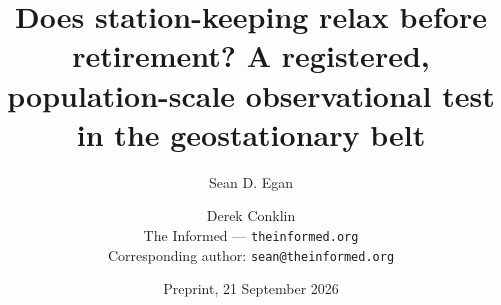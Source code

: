 \documentclass[11pt]{article}
\begin{document}
\title{Does station-keeping relax before retirement? A registered, population-scale observational test in the geostationary belt}
\author{Sean D. Egan \and Derek Conklin\\
  \normalsize The Informed --- \texttt{theinformed.org}\\
  \normalsize Corresponding author: \texttt{sean@theinformed.org}}
\date{Preprint, 21 September 2026}
\maketitle


\end{document}
